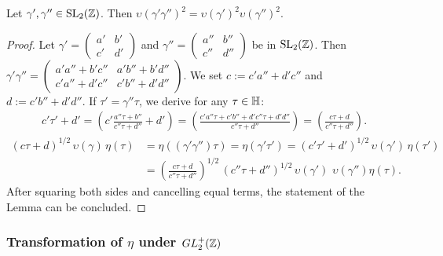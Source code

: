 \documentclass{article}
\begin{document}
\begin{Lemma}
\label{thm:matix-splitting}
Let $\gamma',\gamma''\in \SL2Z$.
%
Then $\upsilon(\gamma'\gamma'')^2 = \upsilon(\gamma')^2 \upsilon(\gamma'')^2$.
\end{Lemma}
\begin{proof}
  Let
  $\gamma'=\left(\begin{smallmatrix}a'&b'\\c'&d'\end{smallmatrix}\right)$
  and
  $\gamma''=\left(\begin{smallmatrix}a''&b''\\c''&d''\end{smallmatrix}\right)$
  be in $\SL2Z$.
  Then
  $\gamma'\gamma'' =
  \left(\begin{smallmatrix}a'a''+b'c''&a'b''+b'd''\\c'a''+d'c''&c'b''+d'd''\end{smallmatrix}\right)$.
  We set $c:=c'a''+d'c''$ and $d:=c'b''+d'd''$.
%
  If $\tau'=\gamma''\tau$, we derive for any $\tau \in \mathbb{H}$:
  \begin{gather*}
    c' \tau' + d'
    =
      \left(c' \frac{a''\tau + b''}{c''\tau + d''} +d'\right)
    =
      \left(\frac{c'a''\tau + c'b''+ d'c''\tau + d'd''}{c''\tau + d''}\right)
    =
    \left(\frac{c\tau + d}{c''\tau + d''}\right).
  \end{gather*}
%
  \begin{align*}
    (c \tau + d)^{1/2}\,\upsilon(\gamma)\,\eta(\tau)
    &=
    \eta((\gamma'\gamma'')\tau) =
    \eta(\gamma'\tau')
    =
      (c'\tau'+d')^{1/2}\,\upsilon(\gamma')\,\eta(\tau')\\
    &=
      \left(\frac{c\tau + d}{c''\tau + d''}\right)^{1/2} \,(c''\tau+d'')^{1/2}
      \,\upsilon(\gamma')\,\,\upsilon(\gamma'')\eta(\tau).
  \end{align*}
  After squaring both sides and cancelling equal terms, the statement
  of the Lemma can be concluded.
\end{proof}



\subsubsection{Transformation of $\eta$ under $GL_2^+(\mathbb{Z})$}
\label{sec:eta-transformation}
\end{document}
